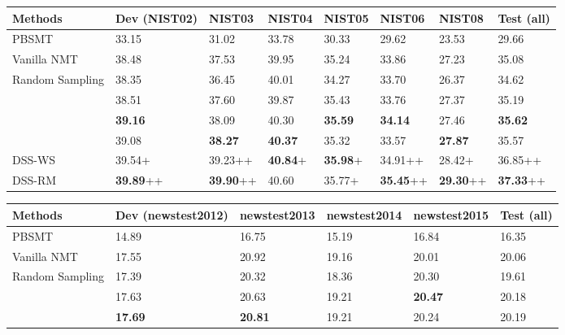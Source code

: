 \documentclass[11pt,a4paper]{article}
\begin{document}
\begin{table*}[ht]\small
	\caption{\label{tab:zh}Results from the NIST ZH-to-EN translation task.}
	\begin{center}
		\begin{tabular}{l|l|l|l|l|l|l|l}
			\hline
			\hline
			Methods & Dev (NIST02) & NIST03 & NIST04 &NIST05&NIST06&NIST08& Test (all)\\
			\hline
			PBSMT&33.15 &  31.02 & 33.78 & 30.33 &29.62&23.53& 29.66\\
			\hline
			Vanilla NMT &  38.48 & 37.53 & 39.95 &35.24&33.86&27.23& 35.08\\
			Random Sampling &38.35  &36.45 &  40.01&34.27&33.70&26.37& 34.62\\
			\citet{DBLP:journals/corr/KocmiB17aa}   &  38.51& 37.60& 39.87 &35.43&33.76&27.37& 35.19\\
			\citet{vanderwees-bisazza-monz:2017:EMNLP2017}  & \textbf{39.16}&  38.09&  40.30&\textbf{35.59}&\textbf{34.14}&27.46& \textbf{35.62}\\
			\citet{zhang-EtAl:2017:I17-2}  & 39.08 &  \textbf{38.27}& \textbf{40.37} &35.32&33.57&\textbf{27.87}& 35.57\\
			\hline
			DSS-WS & 39.54+&  39.23++&  \textbf{40.84}+&\textbf{35.98}+&34.91++&28.42+&36.85++ \\
			DSS-RM &   \textbf{39.89}++&  \textbf{39.90}++&  40.60&35.77+&\textbf{35.45}++&\textbf{29.30}++& \textbf{37.33}++\\
			\hline
			\hline
		\end{tabular}
	\end{center}
	\caption{\label{tab:de}Results from the WMT EN-to-DE translation task.}
	\begin{center}
		\begin{tabular}{l|l|l|l|l|l}
			\hline
			\hline
			Methods &  Dev (newstest2012)& newstest2013 & newstest2014 &newstest2015& Test (all)\\
			\hline
			PBSMT & 14.89& 16.75& 15.19 &16.84& 16.35\\
			\hline
			Vanilla NMT &  17.55& 20.92 & 19.16 &20.01& 20.06\\
			Random Sampling & 17.39& 20.32 & 18.36 &20.30& 19.61\\
			\citet{DBLP:journals/corr/KocmiB17aa} &  17.63& 20.63 & 19.21 &\textbf{20.47}& 20.18\\
			\citet{vanderwees-bisazza-monz:2017:EMNLP2017} & \textbf{17.69}& \textbf{20.81} & 19.21 &20.24& 20.19\\

\end{tabular}
\end{center}
\end{table*}
\end{document}
